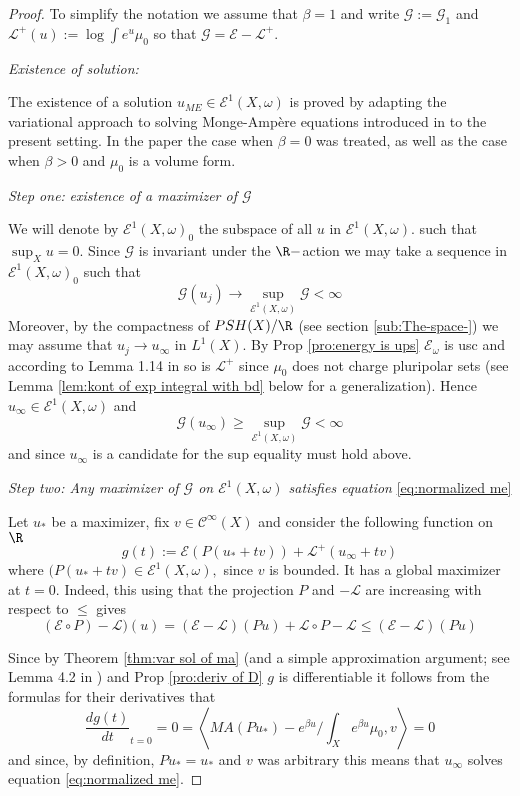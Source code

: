 \documentclass[11pt,oneside,english]{amsart}
\numberwithin{equation}{section}
\numberwithin{figure}{section}
\theoremstyle{plain}
\theoremstyle{plain}
\theoremstyle{plain}
\theoremstyle{plain}
\theoremstyle{remark}
\theoremstyle{definition}
\begin{document}
\begin{proof}
To simplify the notation we assume that $\beta=1$ and write $\mathcal{G}:=\mathcal{G}_{1}$
and $\mathcal{L}^{+}(u):=\log\int e^{u}\mu_{0}$ so that $\mathcal{G}=\mathcal{E}-\mathcal{L}^{+}.$

\emph{Existence of solution:}

The existence of a solution $u_{ME}\in\mathcal{E}^{1}(X,\omega)$
is proved by adapting the variational approach to solving Monge-Ampère
equations introduced in \cite{bbgz} to the present setting. In the
paper \cite{bbgz} the case when $\beta=0$ was treated, as well as
the case when $\beta>0$ and $\mu_{0}$ is a volume form.

\emph{Step one:} \emph{existence of a maximizer of $\mathcal{G}$}

We will denote by $\mathcal{E}^{1}(X,\omega)_{0}$ the subspace of
all $u$ in $\mathcal{E}^{1}(X,\omega).$ such that $\sup_{X}u=0.$
Since $\mathcal{G}$ is invariant under the $\R-$action we may take
a sequence in $\mathcal{E}^{1}(X,\omega)_{0}$ such that 
\[
\mathcal{G}(u_{j})\rightarrow\sup_{\mathcal{E}^{1}(X,\omega)}\mathcal{G}<\infty
\]
 Moreover, by the compactness of $PSH(X)/\R$ (see section \ref{sub:The-space-})
we may assume that $u_{j}\rightarrow u_{\infty}$ in $L^{1}(X).$
By Prop \ref{pro:energy is ups} $\mathcal{E}_{\omega}$ is usc and
according to Lemma 1.14 in \cite{b-b-w} so is $\mathcal{L}^{+}$
since $\mu_{0}$ does not charge pluripolar sets (see Lemma \ref{lem:kont of exp integral with bd}
below for a generalization). Hence $u_{\infty}\in\mathcal{E}^{1}(X,\omega)$
and 
\[
\mathcal{G}(u_{\infty})\geq\sup_{\mathcal{E}^{1}(X,\omega)}\mathcal{G}<\infty
\]
 and since $u_{\infty}$ is a candidate for the sup equality must
hold above.

\emph{Step two: Any maximizer of $\mathcal{G}$ on $\mathcal{E}^{1}(X,\omega)$
satisfies equation }\ref{eq:normalized me}

Let $u_{*}$ be a maximizer, fix $v\in\mathcal{C}^{\infty}(X)$ and
consider the following function on $\R$ 
\[
g(t):=\mathcal{E}(P(u_{*}+tv))+\mathcal{L}^{+}(u_{\infty}+tv)
\]
 where $(P(u_{*}+tv)\in\mathcal{E}^{1}(X,\omega),$ since $v$ is
bounded. It has a global maximizer at $t=0.$ Indeed, this using that
the projection $P$ and $-\mathcal{L}$ are increasing with respect
to $\leq$ gives 
\[
(\mathcal{E\circ}P)-\mathcal{L})(u)=(\mathcal{E}-\mathcal{L})(Pu)+\mathcal{L\circ}P-\mathcal{L\le}(\mathcal{E}-\mathcal{L})(Pu)
\]

Since by Theorem \ref{thm:var sol of ma} (and a simple approximation
argument; see Lemma 4.2 in \cite{bbgz}) and Prop \ref{pro:deriv of D}
$g$ is differentiable it follows from the formulas for their derivatives
that 
\[
\frac{dg(t)}{dt}_{t=0}=0=\left\langle MA(Pu_{*})-e^{\beta u}/\int_{X}e^{\beta u}\mu_{0},v\right\rangle =0
\]
 and since, by definition, $Pu_{*}=u_{*}$ and $v$ was arbitrary
this means that $u_{\infty}$ solves equation \ref{eq:normalized me}.


\end{proof}
\end{document}
